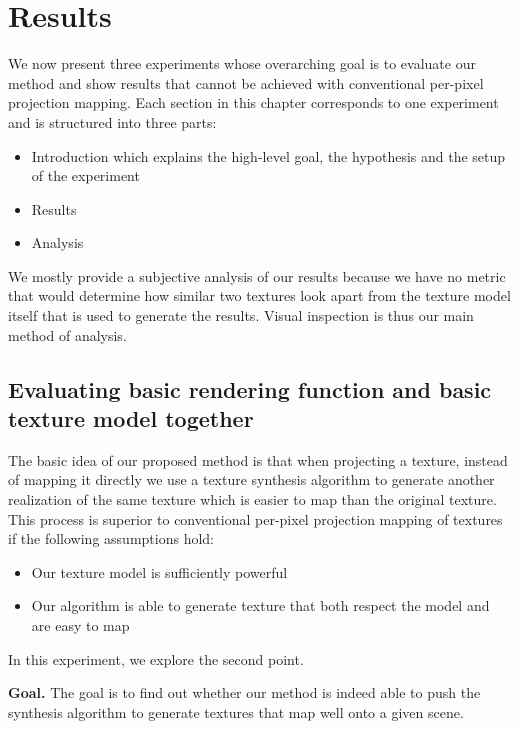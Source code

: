 \chapter{Results}
\label{chapter:results}

We now present three experiments whose overarching goal is to evaluate our method and show results that cannot be achieved with conventional per-pixel projection mapping. Each section in this chapter corresponds to one experiment and is structured into three parts: 

\begin{itemize}
    \item Introduction which explains the high-level goal, the hypothesis and the setup of the experiment
    \item Results
    \item Analysis
\end{itemize}

We mostly provide a subjective analysis of our results because we have no metric that would determine how similar two textures look apart from the texture model itself that is used to generate the results. Visual inspection is thus our main method of analysis.

\section{Evaluating basic rendering function and basic texture model together}
\label{section:results-experiments-01}

The basic idea of our proposed method is that when projecting a texture, instead of mapping it directly we use a texture synthesis algorithm to generate another realization of the same texture which is easier to map than the original texture. This process is superior to conventional per-pixel projection mapping of textures if the following assumptions hold:

\begin{itemize}
    \item Our texture model is sufficiently powerful
    \item Our algorithm is able to generate texture that both respect the model and are easy to map
\end{itemize}

In this experiment, we explore the second point.

\textbf{Goal.} The goal is to find out whether our method is indeed able to push the synthesis algorithm to generate textures that map well onto a given scene.


